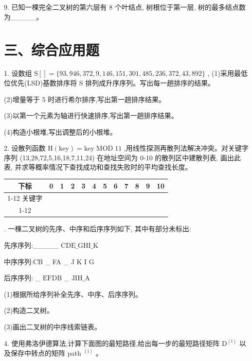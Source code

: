 9. 已知一棵完全二叉树的第六层有 8 个叶结点, 树根位于第一层, 树的最多结点数为\_\_\_\_\_。

\section*{三、综合应用题}

1. 设数组 \(\mathrm{S}\left\lbrack  \right\rbrack   = \{ {93},{946},{372},9,{146},{151},{301},{485},{236},{372},{43},{892}\}\) , (1)采用最低位优先(LSD)基数排序将 S 排列成升序序列。写出每一趟排序的结果。

(2)增量等于 5 时进行希尔排序,写出第一趟排序结果。

(3)以第一个元素为轴进行快速排序,写出第一趟排序结果。

(4)构造小根堆,写出调整后的小根堆。

2. 设散列函数 \(\mathrm{H}\left( \mathrm{{key}}\right)  = \mathrm{{key}}\;\mathrm{MOD}\;{11}\) ,用线性探测再散列法解决冲突。对关键字序列 (13,28,72,5,16,18,7,11,24) 在地址空间为 0-10 的散列区中建散列表, 画出此表, 并求等概率情况下查找成功和查找失败时的平均查找长度。

\begin{center}
\begin{tabular}{|c|c|c|c|c|c|c|c|c|c|c|c|}
\hline
下标 & 0 & 1 & 2 & 3 & 4 & 5 & 6 & 7 & 8 & 9 & 10 \\
\cline{1-12}
关键字 & \phantom{X} & \phantom{X} & \phantom{X} & \phantom{X} & \phantom{X} & \phantom{X} & \phantom{X} & \phantom{X} & \phantom{X} & \phantom{X} & \phantom{X} \\
\cline{1-12}
\hline
\end{tabular}
\end{center}

. 一棵二叉树的先序、中序和后序序列如下, 其中有部分未标出:

先序序列:\_\_\_\_\_ \(\mathrm{{CDE}}\_ \mathrm{{GHI}}\_ \mathrm{K}\)

中序序列:CB \_ FA \_ J K I G

后序序列: \_ \(\mathrm{{EFDB}}\) \_ \(\mathrm{{JIH}}\_ \mathrm{A}\)

(1)根据所给序列补全先序、中序、后序序列。

(2)构造二叉树。

(3)画出二叉树的中序线索链表。

4. 使用弗洛伊德算法,计算下面图的最短路径,给出每一步的最短路径矩阵 \({\mathrm{D}}^{\left( \mathrm{i}\right) }\) 以及保存中转点的矩阵 path \({}^{\left( \mathrm{i}\right) }\) 。

